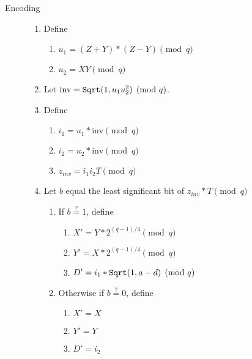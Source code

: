 \begin{description}
	\item[Encoding] \hfill
        \begin{enumerate}
            \item Define
            \begin{enumerate}
                \item $u_1 = (Z + Y)*(Z - Y) \pmod q$
                \item $u_2 = X Y \pmod q$
            \end{enumerate}
    
            \item Let $\textrm{inv} = \textrm{{\tt Sqrt}}(1, u_1 u^2_2) \pmod q$.

            \item Define
            \begin{enumerate}
                \item $i_1 = u_1*\textrm{inv} \pmod q$
                \item $i_2 = u_2*\textrm{inv} \pmod q$
                \item $z_{inv} = i_1 i_2 T \pmod q$
            \end{enumerate}

            \item Let $b$ equal the least significant bit of $z_{inv} * T \pmod q$
            \begin{enumerate}
                \item If $b \stackrel{?}{=} 1$, define
                \begin{enumerate}
                    \item $X' = Y * 2^{(q-1)/4} \pmod q$
                    \item $Y' = X * 2^{(q-1)/4} \pmod q$
                    \item $D' = i_1 * \textrm{{\tt Sqrt}}(1, a - d) \pmod q$
                \end{enumerate}
                \item Otherwise if $b \stackrel{?}{=} 0$, define
                \begin{enumerate}
                    \item $X' = X$
                    \item $Y' = Y$
                    \item $D' = i_2$
                \end{enumerate}
            \end{enumerate}


\end{enumerate}
\end{description}
